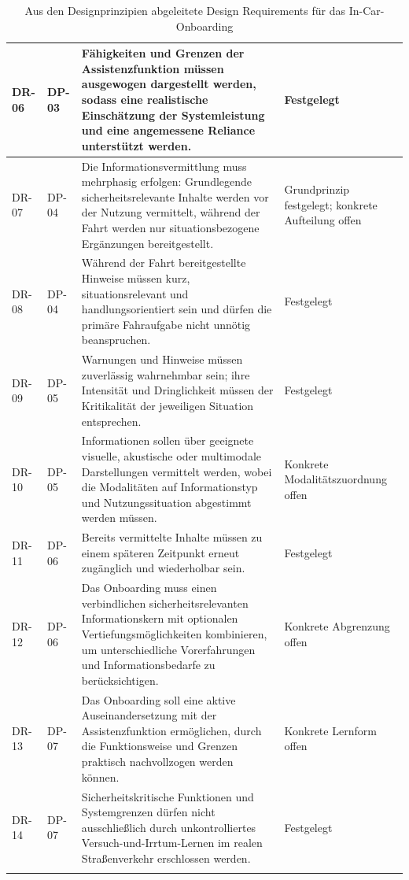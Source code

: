 {\begin{xltabular}{\textwidth}{
    |P{0.08\textwidth}
    |P{0.10\textwidth}
    |Y
    |P{0.18\textwidth}|
}
DR-06 &
DP-03 &
Fähigkeiten und Grenzen der Assistenzfunktion müssen ausgewogen dargestellt
werden, sodass eine realistische Einschätzung der Systemleistung und eine
angemessene Reliance unterstützt werden. &
Festgelegt
\\
\hline

DR-07 &
DP-04 &
Die Informationsvermittlung muss mehrphasig erfolgen: Grundlegende
sicherheitsrelevante Inhalte werden vor der Nutzung vermittelt, während der
Fahrt werden nur situationsbezogene Ergänzungen bereitgestellt. &
Grundprinzip festgelegt; konkrete Aufteilung offen
\\
\hline

DR-08 &
DP-04 &
Während der Fahrt bereitgestellte Hinweise müssen kurz, situationsrelevant und
handlungsorientiert sein und dürfen die primäre Fahraufgabe nicht unnötig
beanspruchen. &
Festgelegt
\\
\hline

DR-09 &
DP-05 &
Warnungen und Hinweise müssen zuverlässig wahrnehmbar sein; ihre Intensität
und Dringlichkeit müssen der Kritikalität der jeweiligen Situation entsprechen. &
Festgelegt
\\
\hline

DR-10 &
DP-05 &
Informationen sollen über geeignete visuelle, akustische oder multimodale
Darstellungen vermittelt werden, wobei die Modalitäten auf Informationstyp und
Nutzungssituation abgestimmt werden müssen. &
Konkrete Modalitätszuordnung offen
\\
\hline

DR-11 &
DP-06 &
Bereits vermittelte Inhalte müssen zu einem späteren Zeitpunkt erneut
zugänglich und wiederholbar sein. &
Festgelegt
\\
\hline

DR-12 &
DP-06 &
Das Onboarding muss einen verbindlichen sicherheitsrelevanten Informationskern
mit optionalen Vertiefungsmöglichkeiten kombinieren, um unterschiedliche
Vorerfahrungen und Informationsbedarfe zu berücksichtigen. &
Konkrete Abgrenzung offen
\\
\hline

DR-13 &
DP-07 &
Das Onboarding soll eine aktive Auseinandersetzung mit der Assistenzfunktion
ermöglichen, durch die Funktionsweise und Grenzen praktisch nachvollzogen
werden können. &
Konkrete Lernform offen
\\
\hline

DR-14 &
DP-07 &
Sicherheitskritische Funktionen und Systemgrenzen dürfen nicht ausschließlich
durch unkontrolliertes Versuch-und-Irrtum-Lernen im realen Straßenverkehr
erschlossen werden. &
Festgelegt
\\
\hline

\caption{Aus den Designprinzipien abgeleitete Design Requirements für das In-Car-Onboarding}
\label{tab:design-requirements}
\\

\end{xltabular}
}

